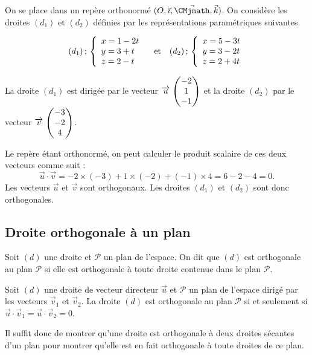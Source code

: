 \documentclass[11pt,fleqn, openany]{book} %
\begin{document}
\begin{example}On se place dans un repère orthonormé $(O,\vec{\imath}, \vec{\CMjmath}, \vec k)$. On considère les droites $(d_1)$ et $(d_2)$ définies par les représentations paramétriques suivantes.

\[ (d_1)\, ; \, \left\{ \renewcommand{\arraystretch}{1}\begin{array}{l}x=1-2t\\y=3+t\\z=2-t\end{array}\right. \quad \text{et} \quad (d_2)\, ; \, \left\{ \renewcommand{\arraystretch}{1}\begin{array}{l}x=5-3t\\y=3-2t\\z=2+4t\end{array}\right.\]

La droite $(d_1)$ est dirigée par le vecteur $\renewcommand{\arraystretch}{1}\coorde{u}{-2}{1}{-1}$ et la droite $(d_2)$  par le vecteur $\renewcommand{\arraystretch}{1}\coorde{v}{-3}{-2}{4}$.

Le repère étant orthonormé, on peut calculer le produit scalaire de ces deux vecteurs comme suit :\[ \vec u \cdot \vec v = -2 \times (-3) + 1 \times (-2) + (-1) \times 4 = 6-2-4=0.\]
Les vecteurs $\vec u$ et $\vec v$ sont orthogonaux. Les droites $(d_1)$ et $(d_2)$ sont donc orthogonales.\end{example}

\subsection{Droite orthogonale à un plan}

\begin{definition}Soit $(d)$ une droite et $\mathcal{P}$ un plan de l'espace. On dit que $(d)$ est orthogonale au plan $\mathcal{P}$ si elle est orthogonale à toute droite contenue dans le plan $\mathcal{P}$.\end{definition}

\begin{proposition}Soit $(d)$ une droite de vecteur directeur $\vec u$ et $\mathcal{P}$ un plan de l'espace dirigé par les vecteurs $\vec v_1$ et $\vec v_2$. La droite $(d)$ est orthogonale au plan $\mathcal{P}$ si et seulement si $\vec u \cdot \vec v_1 = \vec u \cdot \vec v_2 = 0$.\end{proposition}

Il suffit donc de montrer qu'une droite est orthogonale à deux droites sécantes d'un plan pour montrer qu'elle est en fait orthogonale à toute droites de ce plan.
\end{document}
